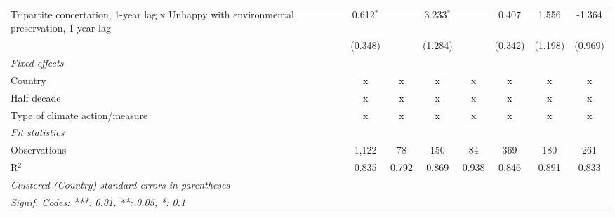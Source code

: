 \begin{table}[htbp]
\begin{tabular}{lccccccc}
      Tripartite concertation, 1-year lag x Unhappy with environmental preservation, 1-year lag & 0.612$^{*}$   &                           & 3.233$^{*}$    &                  & 0.407           & 1.556           & -1.364\\   
                                                                                                & (0.348)       &                           & (1.284)        &                  & (0.342)         & (1.198)         & (0.969)\\   
      \emph{Fixed effects}\\
      Country                                                                                   & x             & x                         & x              & x                & x               & x               & x\\  
      Half decade                                                                               & x             & x                         & x              & x                & x               & x               & x\\  
      Type of climate action/measure                                                            & x             & x                         & x              & x                & x               & x               & x\\  
      \midrule \emph{Fit statistics}\\
      Observations                                                                              & 1,122         & 78                        & 150            & 84               & 369             & 180             & 261\\  
      R$^2$                                                                                     & 0.835         & 0.792                     & 0.869          & 0.938            & 0.846           & 0.891           & 0.833\\  
      \midrule
      \multicolumn{8}{l}{\emph{Clustered (Country) standard-errors in parentheses}}\\
      \multicolumn{8}{l}{\emph{Signif. Codes: ***: 0.01, **: 0.05, *: 0.1}}\\
   \end{tabular}
\end{table}


